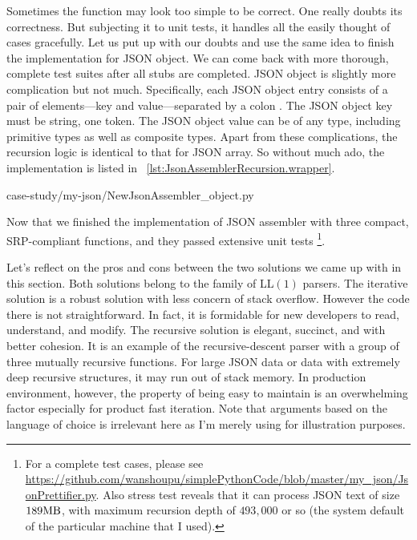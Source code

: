 Sometimes the function may look too simple to be correct.
One really doubts its correctness.
But subjecting it to unit tests, it handles all the easily thought of cases gracefully.
Let us put up with our doubts and use the same idea
to finish the implementation for JSON object.
We can come back with more thorough, complete test suites after all stubs are completed.
JSON object is slightly more complication but not much.
Specifically, each JSON object entry consists of a pair of elements---key and value---separated
by a colon .
The JSON object key must be string, one token.
The JSON object value can be of any type, including primitive types as well as composite types.
Apart from these complications, the recursion logic is identical to that for JSON array.
So without much ado, the implementation is listed in ~\autoref{lst:JsonAssemblerRecursion.wrapper}.

\begin{table}[H]

{case-study/my-json/NewJsonAssembler_object.py}
\end{table}

Now that we finished the implementation of JSON assembler with three compact,
SRP-compliant functions, and they passed extensive unit tests \footnote{For a complete test
cases, please see
\url{https://github.com/wanshoupu/simplePythonCode/blob/master/my_json/JsonPrettifier.py}.
Also stress test reveals that it can process JSON text of size $189\mbox{\code{MB}}$, with maximum
recursion depth of $493,000$ or so (the system default of the particular machine that I used).}.

Let's reflect on the pros and cons between the two solutions we came up with in this section.
Both solutions belong to the family of LL$(1)$ parsers\cite{Rosenkrantz:1969:LL-parser}.
The iterative solution is a robust solution with less concern of stack overflow.
However the code there is not straightforward.
In fact, it is formidable for new developers to read, understand, and modify.
The recursive solution is elegant, succinct, and with better cohesion.
It is an example of the recursive-descent parser with a group
of three mutually recursive functions.
For large JSON data or data with extremely deep recursive structures, it may run out of stack
memory.
In production environment, however, the property of being easy to maintain is an overwhelming
factor especially for product fast iteration.
Note that arguments based on the language of choice is irrelevant here as I'm merely using
\python for illustration purposes.

